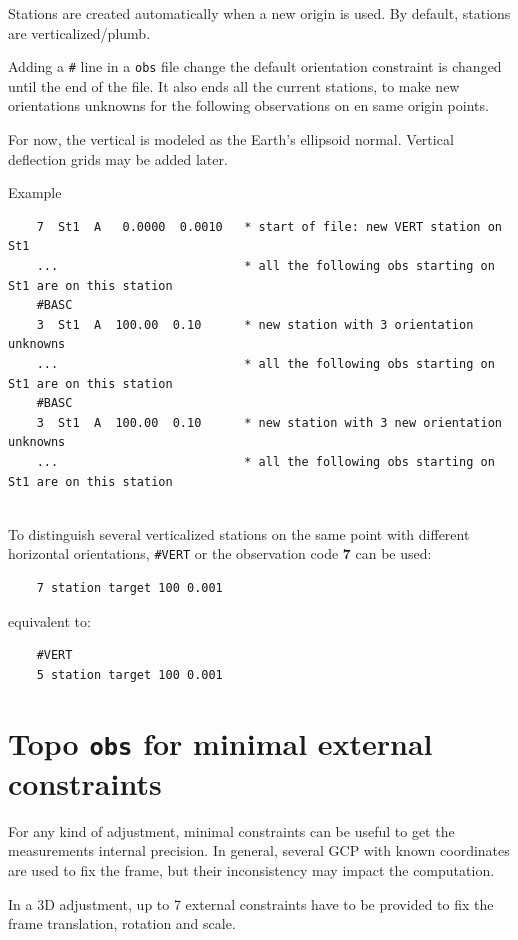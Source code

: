 Stations are created automatically when a new origin is used.
By default, stations are verticalized/plumb.

Adding a \texttt{\#} line in a \texttt{obs} file change the default orientation constraint
is changed until the end of the file. It also ends all the current stations, to make new
orientations unknowns for the following observations on en same origin points.

For now, the vertical is modeled as the Earth's ellipsoid normal. Vertical deflection grids may be added later.

Example
\begin{verbatim}
    7  St1  A   0.0000  0.0010   * start of file: new VERT station on St1
    ...                          * all the following obs starting on St1 are on this station
    #BASC
    3  St1  A  100.00  0.10      * new station with 3 orientation unknowns
    ...                          * all the following obs starting on St1 are on this station
    #BASC
    3  St1  A  100.00  0.10      * new station with 3 new orientation unknowns
    ...                          * all the following obs starting on St1 are on this station
    
\end{verbatim}

To distinguish several verticalized stations on the same point with different horizontal orientations, \texttt{\#VERT} or the observation code {\textbf 7} can be used:

\begin{verbatim}
    7 station target 100 0.001
\end{verbatim}

equivalent to:

\begin{verbatim}
    #VERT
    5 station target 100 0.001
\end{verbatim}


\section{Topo \texttt{obs} for minimal external constraints}

For any kind of adjustment, minimal constraints can be useful to get the measurements internal precision.
In general, several GCP with known coordinates are used to fix the frame, but their inconsistency may
impact the computation.

In a 3D adjustment, up to 7 external constraints have to be provided to fix the frame translation, rotation and scale.

